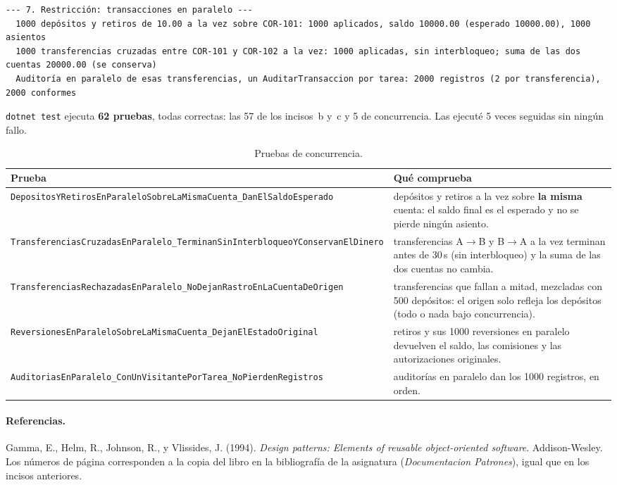 \begin{lstlisting}[language={}, numbers=none, basicstyle=\ttfamily\scriptsize, columns=fullflexible, keepspaces=true, breaklines=true]
--- 7. Restricción: transacciones en paralelo ---
  1000 depósitos y retiros de 10.00 a la vez sobre COR-101: 1000 aplicados, saldo 10000.00 (esperado 10000.00), 1000 asientos
  1000 transferencias cruzadas entre COR-101 y COR-102 a la vez: 1000 aplicadas, sin interbloqueo; suma de las dos cuentas 20000.00 (se conserva)
  Auditoría en paralelo de esas transferencias, un AuditarTransaccion por tarea: 2000 registros (2 por transferencia), 2000 conformes
\end{lstlisting}

\texttt{dotnet test} ejecuta \textbf{62 pruebas}, todas correctas: las 57 de los incisos~b
y~c y 5 de concurrencia. Las ejecuté 5 veces seguidas sin ningún fallo.

\begin{table}[H]
\centering
\footnotesize
\begin{tabularx}{\textwidth}{>{\raggedright\arraybackslash}p{7cm} >{\raggedright\arraybackslash}X}
\toprule
\textbf{Prueba} & \textbf{Qué comprueba} \\
\midrule
\texttt{DepositosYRetirosEnParalelo\-SobreLaMismaCuenta\_DanElSaldoEsperado} & 1000 depósitos
  y retiros a la vez sobre \textbf{la misma} cuenta: el saldo final es el esperado y no se
  pierde ningún asiento. \\
\addlinespace
\texttt{TransferenciasCruzadasEnParalelo\_\-TerminanSinInterbloqueoYConservanElDinero} & 1000
  transferencias A$\rightarrow$B y B$\rightarrow$A a la vez terminan antes de 30\,s (sin
  interbloqueo) y la suma de las dos cuentas no cambia. \\
\addlinespace
\texttt{TransferenciasRechazadasEnParalelo\_\-NoDejanRastroEnLaCuentaDeOrigen} & 500
  transferencias que fallan a mitad, mezcladas con 500 depósitos: el origen solo refleja los
  depósitos (todo o nada bajo concurrencia). \\
\addlinespace
\texttt{ReversionesEnParaleloSobreLaMismaCuenta\_\-DejanElEstadoOriginal} & 1000 retiros y sus
  1000 reversiones en paralelo devuelven el saldo, las comisiones y las autorizaciones
  originales. \\
\addlinespace
\texttt{AuditoriasEnParalelo\_ConUnVisitante\-PorTarea\_NoPierdenRegistros} & 1000 auditorías
  en paralelo dan los 1000 registros, en orden. \\
\bottomrule
\end{tabularx}
\caption{Pruebas de concurrencia.}
\end{table}

\paragraph{Referencias.}
Gamma, E., Helm, R., Johnson, R., y Vlissides, J. (1994). \emph{Design patterns: Elements of
reusable object-oriented software}. Addison-Wesley. Los números de página corresponden a la
copia del libro en la bibliografía de la asignatura (\emph{Documentacion Patrones}), igual que
en los incisos anteriores.

\endgroup
